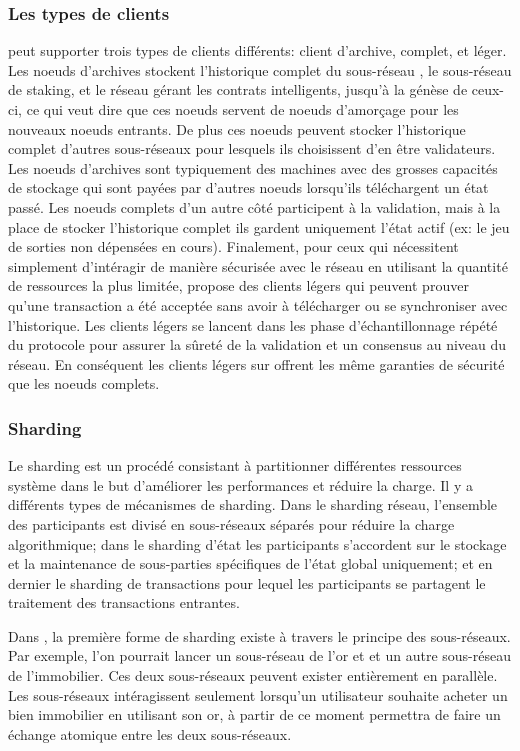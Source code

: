 \documentclass[runningheads]{llncs}
\begin{document}
\subsubsection{Les types de clients}
\AVAPlatformName{} peut supporter trois types de clients différents: client d'archive, complet, et léger. Les noeuds
d'archives stockent l'historique complet du sous-réseau \AVATokenName{}, le sous-réseau de staking, et le réseau gérant
les contrats intelligents, jusqu'à la génèse de ceux-ci, ce qui veut dire que ces noeuds servent de noeuds d'amorçage
pour les nouveaux noeuds entrants. De plus ces noeuds peuvent stocker l'historique complet d'autres sous-réseaux pour
lesquels ils choisissent d'en être validateurs. Les noeuds d'archives sont typiquement des machines avec des grosses
capacités de stockage qui sont payées par d'autres noeuds lorsqu'ils téléchargent un état passé. Les noeuds complets
d'un autre côté participent à la validation, mais à la place de stocker l'historique complet ils gardent uniquement
l'état actif (ex: le jeu de sorties non dépensées en cours). Finalement, pour ceux qui nécessitent simplement
d'intéragir de manière sécurisée avec le réseau en utilisant la quantité de ressources la plus limitée,
\AVAPlatformName{} propose des clients légers qui peuvent prouver qu'une transaction a été acceptée sans avoir à
télécharger ou se synchroniser avec l'historique. Les clients légers se lancent dans les phase d'échantillonnage répété
du protocole pour assurer la sûreté de la validation et un consensus au niveau du réseau. En conséquent les clients
légers sur \AVAPlatformName{} offrent les même garanties de sécurité que les noeuds complets.

\subsubsection{Sharding}
Le sharding est un procédé consistant à partitionner différentes ressources système dans le but d'améliorer les
performances et réduire la charge. Il y a différents types de mécanismes de sharding. Dans le sharding réseau,
l'ensemble des participants est divisé en sous-réseaux séparés pour réduire la charge algorithmique; dans le sharding
d'état les participants s'accordent sur le stockage et la maintenance de sous-parties spécifiques de l'état global
uniquement; et en dernier le sharding de transactions pour lequel les participants se partagent le traitement des
transactions entrantes.

Dans \AVAPlatformNameFirstRelease{}, la première forme de sharding existe à travers le principe des sous-réseaux. Par
exemple, l'on pourrait lancer un sous-réseau de l'or et et un autre sous-réseau de l'immobilier. Ces deux sous-réseaux
peuvent exister entièrement en parallèle. Les sous-réseaux intéragissent seulement lorsqu'un utilisateur souhaite
acheter un bien immobilier en utilisant son or, à partir de ce moment \AVAPlatformName{} permettra de faire un
échange atomique entre les deux sous-réseaux.
\end{document}
